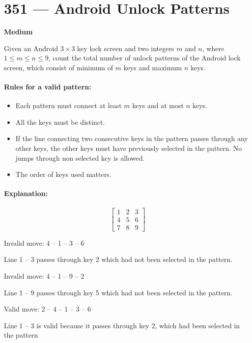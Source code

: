 \section{351 --- Android Unlock Patterns}

\textbf{Medium}

Given an Android $3\times 3$ key lock screen and two integers $m$ and $n$, where $1 \leq m \leq n \leq 9$, count the total number of unlock patterns of the Android lock screen, which consist of minimum of $m$ keys and maximum $n$ keys.

 

\paragraph{Rules for a valid pattern:}

\begin{itemize}
\item Each pattern must connect at least $m$ keys and at most $n$ keys.
\item All the keys must be distinct.
\item If the line connecting two consecutive keys in the pattern passes through any other keys, the other keys must have previously selected in the pattern. No jumps through non selected key is allowed.
\item The order of keys used matters.
\end{itemize}

\paragraph{Explanation:}

\[
\begin{bmatrix}
1 & 2 & 3\\
4 & 5 & 6\\
7 & 8 & 9
\end{bmatrix}
\]

Invalid move: 4 -- 1 -- 3 -- 6

Line 1 -- 3 passes through key 2 which had not been selected in the pattern.

Invalid move: 4 -- 1 -- 9 -- 2

Line 1 -- 9 passes through key 5 which had not been selected in the pattern.

Valid move: 2 -- 4 -- 1 -- 3 -- 6

Line 1 -- 3 is valid because it passes through key 2, which had been selected in the pattern

